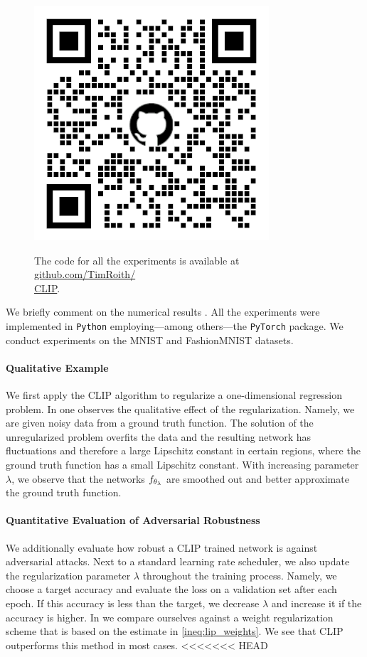 \begin{figure}
\begin{center}
\includegraphics[width=.4\textwidth]{atelier/CLIP/CLIPQR.png}
\end{center}
The code for all the experiments is available at \href{https://github.com/TimRoith/CLIP}{github.com/TimRoith/}\\
\href{https://github.com/TimRoith/CLIP}{CLIP}.
\end{figure}
We briefly comment on the numerical results \cite{bungert2021clip}. All the experiments were implemented in \texttt{Python} \cite{van1995python} employing---among others---the \texttt{PyTorch} \cite{paszke2019pytorch} package. We conduct experiments on the MNIST \cite{leCun10} and FashionMNIST \cite{Han17} datasets.

\paragraph{Qualitative Example} We first apply the CLIP algorithm to regularize a one-dimensional regression problem. In \cite[Fig. 2]{bungert2021clip} one observes the qualitative effect of the regularization. Namely, we are given noisy data from a ground truth function. The solution of the unregularized problem overfits the data and the resulting network has fluctuations and therefore a large Lipschitz constant in certain regions, where the ground truth function has a small Lipschitz constant. With increasing parameter $\lambda$, we observe that the networks $f_{\theta_\lambda}$ are smoothed out and better approximate the ground truth function.
%
\paragraph{Quantitative Evaluation of Adversarial Robustness} We additionally evaluate how robust a CLIP trained network is against adversarial attacks. Next to a standard learning rate scheduler, we also update the regularization parameter $\lambda$ throughout the training process. Namely, we choose a target accuracy and evaluate the loss on a validation set after each epoch. If this accuracy is less than the target, we decrease $\lambda$ and increase it if the accuracy is higher. In \cite[Tab. 1]{bungert2021clip} we compare ourselves against a weight regularization scheme that is based on the estimate in \cref{ineq:lip_weights}. We see that CLIP outperforms this method in most cases.
%
%
%
%
%
%
%
%
\clearpage%
<<<<<<< HEAD

